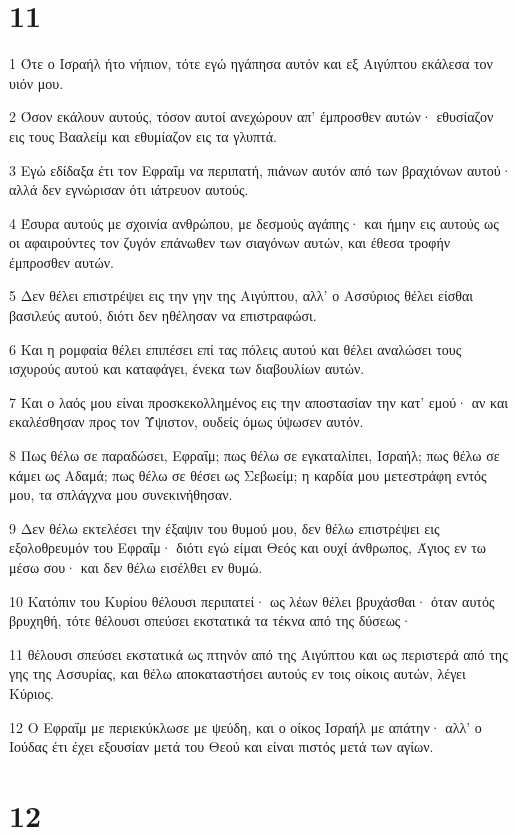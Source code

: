 \chapter{11}

\par 1 Ότε ο Ισραήλ ήτο νήπιον, τότε εγώ ηγάπησα αυτόν και εξ Αιγύπτου εκάλεσα τον υιόν μου.
\par 2 Όσον εκάλουν αυτούς, τόσον αυτοί ανεχώρουν απ' έμπροσθεν αυτών· εθυσίαζον εις τους Βααλείμ και εθυμίαζον εις τα γλυπτά.
\par 3 Εγώ εδίδαξα έτι τον Εφραΐμ να περιπατή, πιάνων αυτόν από των βραχιόνων αυτού· αλλά δεν εγνώρισαν ότι ιάτρευον αυτούς.
\par 4 Έσυρα αυτούς με σχοινία ανθρώπου, με δεσμούς αγάπης· και ήμην εις αυτούς ως οι αφαιρούντες τον ζυγόν επάνωθεν των σιαγόνων αυτών, και έθεσα τροφήν έμπροσθεν αυτών.
\par 5 Δεν θέλει επιστρέψει εις την γην της Αιγύπτου, αλλ' ο Ασσύριος θέλει είσθαι βασιλεύς αυτού, διότι δεν ηθέλησαν να επιστραφώσι.
\par 6 Και η ρομφαία θέλει επιπέσει επί τας πόλεις αυτού και θέλει αναλώσει τους ισχυρούς αυτού και καταφάγει, ένεκα των διαβουλίων αυτών.
\par 7 Και ο λαός μου είναι προσκεκολλημένος εις την αποστασίαν την κατ' εμού· αν και εκαλέσθησαν προς τον Ύψιστον, ουδείς όμως ύψωσεν αυτόν.
\par 8 Πως θέλω σε παραδώσει, Εφραΐμ; πως θέλω σε εγκαταλίπει, Ισραήλ; πως θέλω σε κάμει ως Αδαμά; πως θέλω σε θέσει ως Σεβωείμ; η καρδία μου μετεστράφη εντός μου, τα σπλάγχνα μου συνεκινήθησαν.
\par 9 Δεν θέλω εκτελέσει την έξαψιν του θυμού μου, δεν θέλω επιστρέψει εις εξολοθρευμόν του Εφραΐμ· διότι εγώ είμαι Θεός και ουχί άνθρωπος, Άγιος εν τω μέσω σου· και δεν θέλω εισέλθει εν θυμώ.
\par 10 Κατόπιν του Κυρίου θέλουσι περιπατεί· ως λέων θέλει βρυχάσθαι· όταν αυτός βρυχηθή, τότε θέλουσι σπεύσει εκστατικά τα τέκνα από της δύσεως·
\par 11 θέλουσι σπεύσει εκστατικά ως πτηνόν από της Αιγύπτου και ως περιστερά από της γης της Ασσυρίας, και θέλω αποκαταστήσει αυτούς εν τοις οίκοις αυτών, λέγει Κύριος.
\par 12 Ο Εφραΐμ με περιεκύκλωσε με ψεύδη, και ο οίκος Ισραήλ με απάτην· αλλ' ο Ιούδας έτι έχει εξουσίαν μετά του Θεού και είναι πιστός μετά των αγίων.

\chapter{12}

